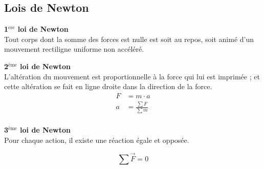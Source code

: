\documentclass[12pt,a4paper]{article} %
\newcommand\textsup[1]{\ensuremath{^{\textrm{#1}}}}
\newcommand\frametitle[1]{ {\bfseries #1} \\[5pt] }
\begin{document}
\subsection{Lois de Newton}
\begin{mdframed}[leftmargin=2em, rightmargin=2em]
	\frametitle{1\textsup{ere} loi de Newton}
	Tout corps dont la somme des forces est nulle est soit au repos, soit animé d'un mouvement rectiligne uniforme non accéléré.
\end{mdframed}
\par\hspace{1em}
\begin{mdframed}[leftmargin=2em, rightmargin=2em]
	\frametitle{2\textsup{ème} loi de Newton}
	L'altération du mouvement est proportionnelle à la force qui lui est imprimée ; et cette altération se fait en ligne droite dans la direction de la force.	
	\begin{align*}
		F &= m \cdot a \\
		a &= \frac{\sum F}{\sum m} \\
	\end{align*}
\end{mdframed}
\par\hspace{1em}
\begin{mdframed}[leftmargin=2em, rightmargin=2em]
	\frametitle{3\textsup{ème} loi de Newton}
	Pour chaque action, il existe une réaction égale et opposée.

	\begin{equation*}
		\sum\overrightarrow{F} = 0
	\end{equation*}
\end{mdframed}

\newpage
\end{document}
